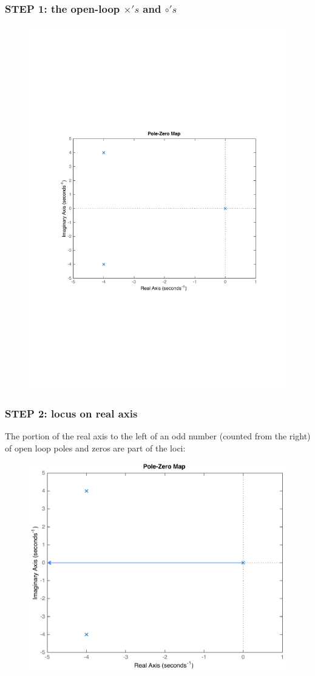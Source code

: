 \begin{frame}
\frametitle{STEP 1: the open-loop $\times's$ and $\circ's$}
	\begin{figure}
		\centering
		\includegraphics[width=0.7\linewidth]{how_to_draw_ex1}
	\end{figure}
\end{frame}

\begin{frame}
\frametitle{STEP 2: locus on real axis}
	The portion of the real axis to the left of an odd number (counted from the right) of open loop poles and zeros are part of the loci:
	\vspace{-0.5em}
	\begin{figure}
		\centering
		\includegraphics[width=0.7\linewidth]{how_to_draw_ex2}
	\end{figure}
\end{frame}

